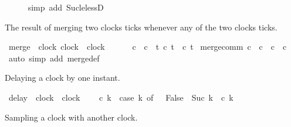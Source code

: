 \begin{isabellebody}
\ \ \ \ \isamarkupfalse%
\ {\isacharparenleft}simp\ add{\isacharcolon}\ Suc{\isacharunderscore}le{\isacharunderscore}lessD{\isacharparenright}\isanewline
{}\isamarkupfalse%
%
\endisatagproof
{\isafoldproof}%
%
\isadelimproof
%
\endisadelimproof
%
\isadelimdocument
%
\endisadelimdocument
%
\isatagdocument
%
\isamarkuptrue%
%
\endisatagdocument
{\isafolddocument}%
%
\isadelimdocument
%
\endisadelimdocument
%
\begin{isamarkuptext}%
The result of merging two clocks ticks whenever any of the two clocks ticks.%
\end{isamarkuptext}\isamarkuptrue%
\isamarkupfalse%
\ merge\ {\isacharcolon}{\isacharcolon}\ {\isacartoucheopen}{\isacharbrackleft}clock{\isacharcomma}\ clock{\isacharbrackright}\ {\isasymRightarrow}\ clock{\isacartoucheclose}\ {\isacharparenleft}\ {\isacartoucheopen}{\isasymoplus}{\isacartoucheclose}\ {}{}{\isacharparenright}\isanewline
\ \ \ {\isacartoucheopen}c{}\ {\isasymoplus}\ c{}\ {\isasymequiv}\ {\isasymlambda}t{\isachardot}\ c{}\ t\ {\isasymor}\ c{}\ t{\isacartoucheclose}\isanewline
\isanewline
{}\isamarkupfalse%
\ merge{\isacharunderscore}comm{\isacharcolon}\ {\isacartoucheopen}c\ {\isasymoplus}\ c{\isacharprime}\ {\isacharequal}\ c{\isacharprime}\ {\isasymoplus}\ c{\isacartoucheclose}\isanewline
%
\isadelimproof
%
\endisadelimproof
%
\isatagproof
{}\isamarkupfalse%
\ {\isacharparenleft}auto\ simp\ add{\isacharcolon}\ merge{\isacharunderscore}def{\isacharparenright}%
\endisatagproof
{\isafoldproof}%
%
\isadelimproof
%
\endisadelimproof
%
\begin{isamarkuptext}%
Delaying a clock by one instant.%
\end{isamarkuptext}\isamarkuptrue%
\isamarkupfalse%
\ delay\ {\isacharcolon}{\isacharcolon}\ {\isacartoucheopen}clock\ {\isasymRightarrow}\ clock{\isacartoucheclose}\ {\isacharparenleft}{\isacartoucheopen}{\isachardollar}{\isacartoucheclose}{\isacharparenright}\isanewline
\ \ \ {\isacartoucheopen}{\isachardollar}c\ k\ {\isacharequal}\ {\isacharparenleft}case\ k\ of\ {}\ {\isasymRightarrow}\ False\ {\isacharbar}\ Suc\ k{\isacharprime}\ {\isasymRightarrow}\ c\ k{\isacharprime}{\isacharparenright}{\isacartoucheclose}%
\begin{isamarkuptext}%
Sampling a clock with another clock.%
\end{isamarkuptext}\isamarkuptrue%

\end{isabellebody}
